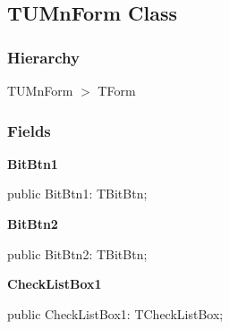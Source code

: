 \documentclass{report}
\newif\ifpdf
\begin{document}
\subsection*{TUMnForm Class}
\fi
\label{mnupdate.TUMnForm}
\subsubsection*{\large{\textbf{Hierarchy}}\normalsize\hspace{1ex}\hfill}
TUMnForm {$>$} TForm
\subsubsection*{\large{\textbf{Fields}}\normalsize\hspace{1ex}\hfill}
\begin{list}{}{
\setlength{\itemindent}{0cm}
\setlength{\listparindent}{0cm}
\setlength{\leftmargin}{\evensidemargin}
\addtolength{\leftmargin}{\tmplength}
\settowidth{\labelsep}{X}
\addtolength{\leftmargin}{\labelsep}
\setlength{\labelwidth}{\tmplength}
}
\label{mnupdate.TUMnForm-BitBtn1}
\item[\textbf{BitBtn1}\hfill]
\ifpdf
\begin{flushleft}
\fi
\begin{ttfamily}
public BitBtn1: TBitBtn;\end{ttfamily}

\ifpdf
\end{flushleft}
\fi


\par  \label{mnupdate.TUMnForm-BitBtn2}
\item[\textbf{BitBtn2}\hfill]
\ifpdf
\begin{flushleft}
\fi
\begin{ttfamily}
public BitBtn2: TBitBtn;\end{ttfamily}

\ifpdf
\end{flushleft}
\fi


\par  \label{mnupdate.TUMnForm-CheckListBox1}
\item[\textbf{CheckListBox1}\hfill]
\ifpdf
\begin{flushleft}
\fi
\begin{ttfamily}
public CheckListBox1: TCheckListBox;\end{ttfamily}

\ifpdf
\end{flushleft}
\fi



\end{list}
\end{document}
